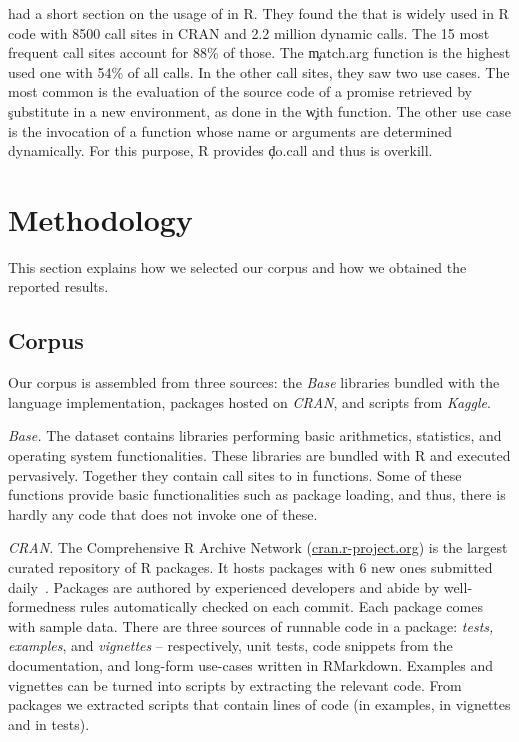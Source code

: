 \documentclass[review,screen,acmsmall,anonymous=true]{acmart}
\newcommand{\mypara}[1]{\medskip\noindent\emph{#1}\xspace}
\begin{document}
\citet{ecoop12} had a short section on the usage of \eval in R. They found the
that \eval  is widely used in R code with 8500 call sites in CRAN and 2.2 million dynamic calls. The 15 most frequent call sites account for 88\% of those. The
\c{match.arg} function is the highest used one with 54\% of all calls. In the
other call sites, they saw two use cases. The most common is the evaluation of
the source code of a promise retrieved by \c{substitute} in a new environment,
\eg as done in the \c{with} function. The other use case is the invocation of a
function whose name or arguments are determined dynamically. For this purpose, R provides \c{do.call} and thus \eval is overkill.


\section{Methodology}

This section explains how we selected our corpus and how we obtained the
reported results.

\subsection{Corpus}

Our corpus is assembled from three sources: the \emph{Base} libraries 
bundled with the language implementation, packages hosted on \emph{CRAN}, and scripts from \emph{Kaggle}.

\mypara{Base.} The dataset contains \BasePackages libraries performing basic
arithmetics, statistics, and operating system functionalities. These libraries
are bundled with R and executed pervasively. Together they contain
\BaseEvalCallSites call sites to \eval in \BaseFunsWithEvals functions. Some of these
functions provide basic functionalities such as package loading, and thus, there
is hardly any code that does not invoke one of these.

\mypara{CRAN.} The Comprehensive R Archive Network
({\small \url{cran.r-project.org}}) is the largest curated repository of R
packages. It hosts \CranAvailablePackagesRnd packages with 6 new ones submitted
daily~\cite{Ligges2017}. Packages are authored by experienced developers and
abide by well-formedness rules automatically checked on each commit.
Each package comes with sample data. There are three sources of
runnable code in a package: \emph{tests, examples}, and \emph{vignettes} --
respectively, unit tests, code snippets from the documentation, and long-form
use-cases written in RMarkdown. Examples and vignettes can be turned into
scripts by extracting the relevant code. From \CranPackages packages we
extracted \CranRunnableScripts scripts that contain \CranRunnableCode lines of
code (\CranRunnableCodeExamplesRnd in examples, \CranRunnableCodeVignettesRnd in
vignettes and \CranRunnableCodeTestsRnd in tests).
\end{document}
